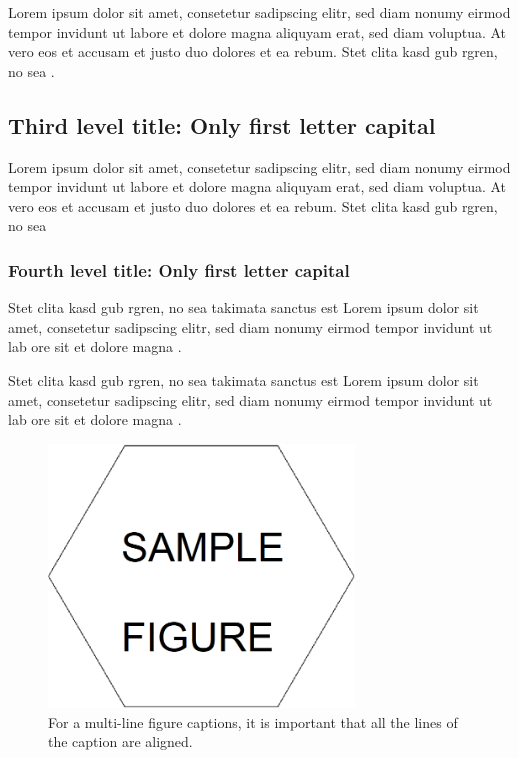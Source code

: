 Lorem ipsum dolor sit amet, consetetur sadipscing elitr, sed diam nonumy eirmod tempor invidunt ut labore et dolore magna aliquyam erat, sed diam voluptua. At vero eos et accusam et justo duo dolores et ea rebum. Stet clita kasd gub rgren, no sea \citep{Zuckerman199486}.

\subsection{Third level title: Only first letter capital}

\citet{Wolchik2000843} Lorem ipsum dolor sit amet, consetetur sadipscing elitr, sed diam nonumy eirmod tempor invidunt ut labore et dolore magna aliquyam erat, sed diam voluptua. At vero eos et accusam et justo duo dolores et ea rebum. Stet clita kasd gub rgren, no sea 

\subsubsection{Fourth level title: Only first letter capital}

\citet{Box:1990:TSA:574978} Stet clita kasd gub rgren, no sea takimata sanctus est Lorem ipsum dolor sit amet, consetetur sadipscing elitr, sed diam nonumy eirmod tempor invidunt ut lab ore sit et dolore magna \citep{HYP:HYP57}.


Stet clita kasd gub rgren, no sea takimata sanctus est Lorem ipsum dolor sit amet, consetetur sadipscing elitr, sed diam nonumy eirmod tempor invidunt ut lab ore sit et dolore magna \citep{url-1,url-2}.

\vspace{6pt} %
\begin{figure}[!ht]
 \centering
 \includegraphics[width=230pt,keepaspectratio=true]{./fig/sekil6.png}
 \caption{For a multi-line figure captions, it is important that all the
  lines of the caption are aligned.}
 \label{fig:ch4-1}
\end{figure}
\vspace{-9pt} %

